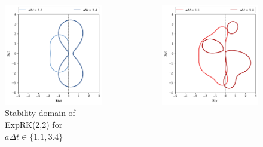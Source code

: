 \documentclass{beamer}
\begin{document}
\begin{frame}{}

  \begin{columns}
    \begin{column}{0.5\textwidth}
      \begin{figure}\centering
        \includegraphics[width=\textwidth]{img/expRK22_sd.png}
        \caption{Stability domain of ExpRK(2,2) for $a\Delta t\in\{1.1, 3.4\}$}
      \end{figure}
    \end{column}
    \begin{column}{0.5\textwidth}
      \begin{figure}\centering
        \includegraphics[width=\textwidth]{img/CM_sd.png}

\end{figure}
\end{column}
\end{columns}
\end{frame}
\end{document}
